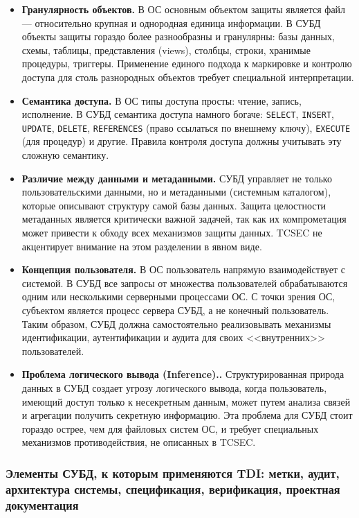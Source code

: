 \begin{itemize}
	\item \textbf{Гранулярность объектов.} В ОС основным объектом защиты является файл --- относительно крупная и однородная единица информации. В СУБД объекты защиты гораздо более разнообразны и гранулярны: базы данных, схемы, таблицы, представления (views), столбцы, строки, хранимые процедуры, триггеры. Применение единого подхода к маркировке и контролю доступа для столь разнородных объектов требует специальной интерпретации.	
	\item \textbf{Семантика доступа.} В ОС типы доступа просты: чтение, запись, исполнение. В СУБД семантика доступа намного богаче: \texttt{SELECT}, \texttt{INSERT}, \texttt{UPDATE}, \texttt{DELETE}, \texttt{REFERENCES} (право ссылаться по внешнему ключу), \texttt{EXECUTE} (для процедур) и другие. Правила контроля доступа должны учитывать эту сложную семантику.
	\item \textbf{Различие между данными и метаданными.} СУБД управляет не только пользовательскими данными, но и метаданными (системным каталогом), которые описывают структуру самой базы данных. Защита целостности метаданных является критически важной задачей, так как их компрометация может привести к обходу всех механизмов защиты данных. TCSEC не акцентирует внимание на этом разделении в явном виде.
	\item \textbf{Концепция пользователя.} В ОС пользователь напрямую взаимодействует с системой. В СУБД все запросы от множества пользователей обрабатываются одним или несколькими серверными процессами ОС. С точки зрения ОС, субъектом является процесс сервера СУБД, а не конечный пользователь. Таким образом, СУБД должна самостоятельно реализовывать механизмы идентификации, аутентификации и аудита для своих <<внутренних>> пользователей.
	\item \textbf{Проблема логического вывода (Inference)..} Структурированная природа данных в СУБД создает угрозу логического вывода, когда пользователь, имеющий доступ только к несекретным данным, может путем анализа связей и агрегации получить секретную информацию. Эта проблема для СУБД стоит гораздо острее, чем для файловых систем ОС, и требует специальных механизмов противодействия, не описанных в TCSEC.
\end{itemize}

\subsubsection{Элементы СУБД, к которым применяются TDI: метки, аудит, архитектура системы, спецификация, верификация, проектная документация}

